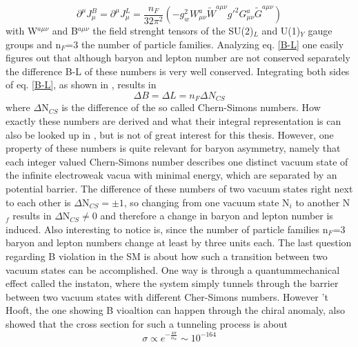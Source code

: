 \begin{equation}
\partial^\mu J_\mu^B=\partial^\mu J_\mu^L=\frac{n_F}{32\pi^2}\left(-g_w^2W^a_{\mu\nu}\tilde{W}^{a\mu\nu}g'^2G^a_{\mu\nu}\tilde{G}^{a\mu\nu}\right)
\label{B-L}
\end{equation}
with W$^{a\mu\nu}$ and B$^{a\mu\nu}$ the field strenght tensors of the SU(2)$_L$ and U(1)$_Y$ gauge groups and n$_F$=3 the number of particle families. \newline
Analyzing eq. \ref{B-L} one easily figures out that although baryon and lepton number are not conserved separately the difference B-L of these numbers is very well conserved.
Integrating both sides of eq. \ref{B-L}, as shown in \cite[pp. 15f.]{Bernreuther:2002uj}, results in 
\begin{equation}
	\Delta B=\Delta L=n_F\Delta N_{CS}
	\label{number_change}
\end{equation}
where $\Delta$N$_{CS}$ is the difference of the so called Chern-Simons numbers. How exactly these numbers are derived and what their integral representation is can also be looked up in \cite{Bernreuther:2002uj,Cline:2006ts,Petropoulos:2003pm}, but is not of great interest for this thesis. However, one property of these numbers is quite relevant for baryon asymmetry, namely that each integer valued Chern-Simons number describes one distinct vacuum state of the infinite electroweak vacua with minimal energy, which are separated by an potential barrier. The difference of these numbers of two vacuum states right next to each other is $\Delta$N$_{CS}=\pm1$, so changing from one vacuum state N$_i$ to another N$_f$ results in $\Delta$N$_{CS}\neq0$ and therefore a change in baryon and lepton number is induced. Also interesting to notice is, since the number of particle families n$_F$=3 baryon and lepton numbers change at least by three units each. \newline
The last question regarding B violation in the SM is about how such a transition between two vacuum states can be accomplished. One way is through a quantummechanical effect called the instaton, where the system simply tunnels through the barrier between two vacuum states with different Cher-Simons numbers. However 't Hooft, the one showing B vioaltion can happen through the chiral anomaly, also showed  \cite[Ref. 22,24]{Bernreuther:2002uj} that the cross section for such a tunneling process is about 
\begin{equation}
	\sigma\propto e^{-\frac{4\pi}{\alpha_w}}\sim10^{-164}
	\label{instaton_cross_section}
\end{equation}
